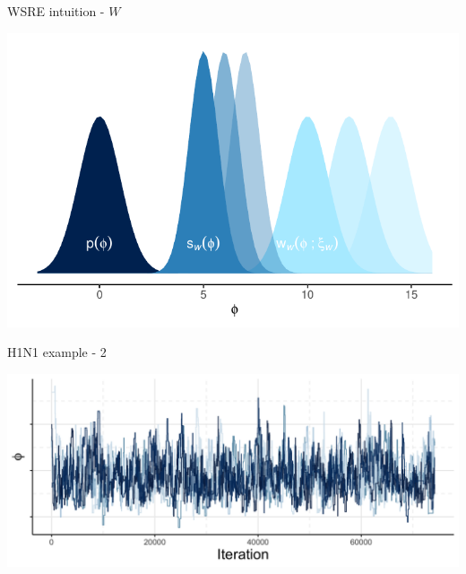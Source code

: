 \documentclass[10pt,ignorenonframetext,]{beamer}
\newcommand{\Nw}{W}
\begin{document}
\begin{frame}{WSRE intuition - \(\Nw\)}

\begin{center}\includegraphics[width=1\linewidth]{figures/weighted-dist-plot-many} \end{center}

\end{frame}

\begin{frame}{H1N1 example - 2}



\begin{center}\includegraphics[width=1\linewidth]{figures/stage-two-trace-presentation-two} \end{center}

\end{frame}
\end{document}
